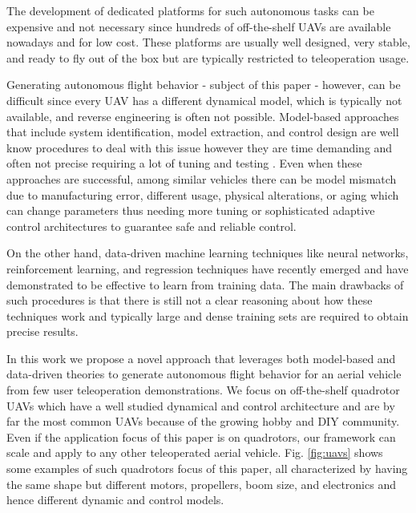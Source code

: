 \documentclass[letterpaper, 10 pt, conference]{ieeeconf}  %
\begin{document}
The development of dedicated platforms for such autonomous tasks can be expensive and not necessary since hundreds of off-the-shelf UAVs are available nowadays and for low cost. These platforms are usually well designed, very stable, and ready to fly out of the box but are typically restricted to teleoperation usage.

Generating autonomous flight behavior - subject of this paper -  however, can be difficult since every UAV has a different dynamical model, which is typically not available, and reverse engineering is often not possible. Model-based approaches that include system identification, model extraction, and control design are well know procedures to deal with this issue however they are time demanding and often not precise requiring a lot of tuning and testing \cite{modelbased1}. Even when these approaches are successful, among similar vehicles there can be model mismatch due to manufacturing error, different usage, physical alterations, or aging which can change parameters thus needing more tuning or sophisticated adaptive control architectures to guarantee safe and reliable control. 

On the other hand, data-driven machine learning techniques like neural networks, reinforcement learning, and regression techniques have recently emerged and have demonstrated to be effective to learn from training data. The main drawbacks of such procedures is that there is still not a clear reasoning about how these techniques work and typically large and dense training sets are required to obtain precise results.

In this work we propose a novel approach that leverages both model-based and data-driven theories to generate autonomous flight behavior for an aerial vehicle from few user teleoperation demonstrations. 
We focus on off-the-shelf quadrotor UAVs which have a well studied dynamical and control architecture and are by far the most common UAVs because of the growing hobby and DIY community. Even if the application  focus of this paper is on quadrotors, our framework can scale and apply to any other teleoperated aerial vehicle. Fig. \ref{fig:uavs} shows some examples of such quadrotors focus of this paper, all characterized by having the same shape but different motors, propellers, boom size, and electronics and hence different dynamic and control models.
\end{document}
